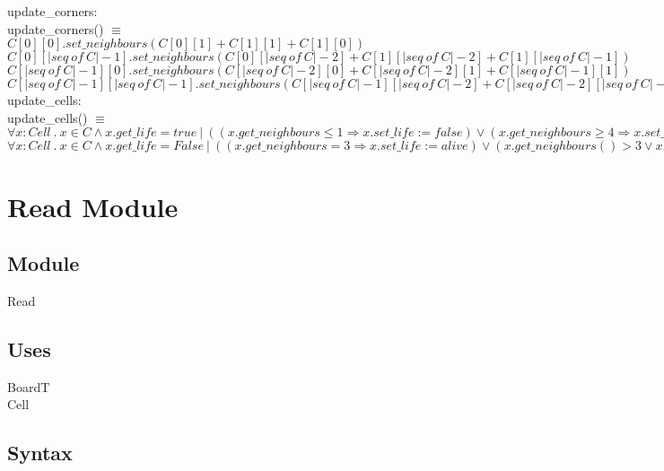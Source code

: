 \documentclass[12pt]{article}
\begin{document}
\noindent
update\_corners: \\
update\_corners() $\equiv$ \\
$C[0][0].set\_neighbours(C[0][1] + C[1][1] + C[1][0])$\\
$C[0][|seq \ of \ C|-1].set\_neighbours(C[0][|seq \ of \ C|-2] + C[1][|seq \ of \ C|-2] + C[1][|seq \ of \ C|-1])$\\
$C[|seq \ of \ C|-1][0].set\_neighbours(C[|seq \ of \ C|-2][0] + C[|seq \ of \ C|-2][1] + C[|seq \ of \ C|-1][1])$\\
$C[|seq \ of \ C|-1][|seq \ of \ C|-1].set\_neighbours(C[|seq \ of \ C|-1][|seq \ of \ C|-2] + C[|seq \ of \ C|-2][|seq \ of \ C|-2] + C[|seq \ of \ C|-2][|seq \ of \ C|-1])$\\

\noindent
update\_cells:\\
update\_cells() $\equiv$ \\
$\forall x : Cell \ . \ x \in C \land x.get\_life = true\ | \ ((x.get\_neighbours \leq 1 \Rightarrow x.set\_life := false) \lor 
(x.get\_neighbours \ge 4 \Rightarrow x.set\_life := false) \lor
(x.get\_neighbours > 1 \land x.get\_neighbours < 4 \Rightarrow x.set\_life := true))$ \\

$\forall x : Cell \ . \ x \in C \land x.get\_life = False \ | \ 
((x.get\_neighbours = 3 \Rightarrow x.set\_life := alive) \lor
(x.get\_neighbours() > 3 \lor x.get\_neighbours < 3 \Rightarrow x.set\_life() := false))$

\newpage

\section* {Read Module}

\subsection*{Module}

Read

\subsection* {Uses}

BoardT\\
Cell

\subsection* {Syntax}
\end{document}
